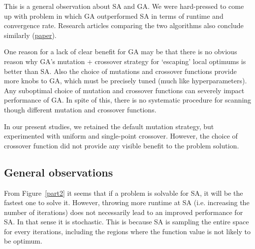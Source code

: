 \documentclass[10pt,letterpaper]{article}
\begin{document}
This is a general observation about SA and GA. We were hard-pressed to come up with problem in which GA outperformed SA in terms of runtime and convergence rate. Research articles comparing the two algorithms also conclude similarly (\href{http://www.cs.helsinki.fi/u/kohonen/papers/gasa.html}{paper}).

One reason for a lack of clear benefit for GA may be that there is no obvious reason why GA's mutation + crossover strategy for `escaping' local optimums is better than SA. Also the choice of mutations and crossover functions provide more knobs to GA, which must be precisely tuned (much like hyperparameters). Any suboptimal choice of mutation and crossover functions can severely impact performance of GA. In spite of this, there is no systematic procedure for scanning though different mutation and crossover functions. 

In our present studies, we retained the default mutation strategy, but experimented with uniform and single-point crossover. However, the choice of crossover function did not provide any visible benefit to the problem solution.

\subsection{General observations}
From Figure~\ref{part2} it seems that if a problem is solvable for SA, it will be the fastest one to solve it. However, throwing more runtime at SA (i.e. increasing the number of iterations) does not necessarily lead to an improved performance for SA. In that sense it is stochastic. This is because SA is sampling the entire space for every iterations, including the regions where the function value is not likely to be optimum. 
\end{document}
